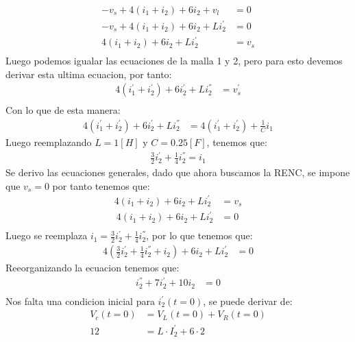 \documentclass[
  11pt,
  letterpaper,
   addpoints,
   answers
  ]{exam}
\begin{document}
\begin{questions}
\begin{solution}
\begin{enumerate}
        \begin{align}
            -v_{s} + 4(i_{1}+i_{2}) + 6i_{2} + v_{l}&= 0\\
            -v_{s} + 4(i_{1}+i_{2}) + 6i_{2} + L i_{2}^{'} &= 0\\
             4(i_{1}+i_{2}) + 6i_{2} + L i_{2}^{'} &= v_{s}\\
        \end{align}
        Luego podemos igualar las ecuaciones de la malla 1 y 2, pero para esto devemos derivar esta ultima ecuacion, por tanto:
        \begin{align}
            4(i_{1}^{'}+i_{2}^{'}) + 6i_{2}^{'} + L i_{2}^{''} &= v_{s}^{'}\\
        \end{align}
        Con lo que de esta manera:
        \begin{align}
            4(i_{1}^{'}+i_{2}^{'}) + 6i_{2}^{'} + L i_{2}^{''} &= 4(i_{1}^{'}+i_{2}^{'}) + \frac{1}{C} i_{1}
        \end{align}
        Luego reemplazando $L=1[H]$ y $C=0.25[F]$, tenemos que:
        \begin{align}
            \frac{3}{2}i_{2}^{'}+ \frac{1}{4}i_{2}^{''} = i_{1}
        \end{align}
        Se derivo las ecuaciones generales, dado que ahora buscamos la RENC, se impone que $v_{s} = 0$ por tanto tenemos que:
        \begin{align}
            4(i_{1} + i_{2}) + 6i_{2} + L i_{2}^{'} &= v_{s}\\\
            4(i_{1} + i_{2}) + 6i_{2} + L i_{2}^{'} &= 0\\
        \end{align}
        Luego se reemplaza $i_{1} = \frac{3}{2}i_{2}^{'}+ \frac{1}{4}i_{2}^{''}$, por lo que tenemos que:
        \begin{align}
            4\left(\frac{3}{2}i_{2}^{'}+ \frac{1}{4}i_{2}^{''} + i_{2}\right) + 6i_{2} + L i_{2}^{'} &= 0
        \end{align}
        Reeorganizando la ecuacion tenemos que:
        \begin{align}
            i_{2}^{''} + 7i_{2}^{'} + 10i_{2} &= 0\\
        \end{align}
        Nos falta una condicion inicial para $i_{2}^{'}(t=0)$, se puede derivar de:
        \begin{align}
            V_{c}(t=0) &= V_{L}(t=0) + V_{R}(t=0)\\
            12 &= L \cdot I_{2}^{'} + 6 \cdot 2\\

\end{align}
\end{enumerate}
\end{solution}
\end{questions}
\end{document}
